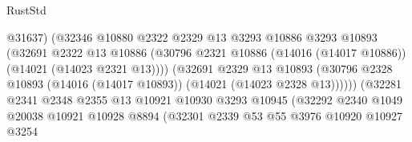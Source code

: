 \begin{lexlean}{RustStd}
\begin{coremodule}
                                          @31637)
                                        (@32346
                                          @10880
                                          @2322
                                          @2329
                                          @13
                                          @3293
                                          @10886
                                          @3293
                                          @10893
                                          (@32691
                                            @2322
                                            @13
                                            @10886
                                            (@30796
                                              @2321
                                              @10886
                                              (@14016 (@14017 @10886))
                                              (@14021 (@14023 @2321 @13))))
                                          (@32691
                                            @2329
                                            @13
                                            @10893
                                            (@30796
                                              @2328
                                              @10893
                                              (@14016 (@14017 @10893))
                                              (@14021 (@14023 @2328 @13))))))
                                      (@32281
                                        @2341
                                        @2348
                                        @2355
                                        @13
                                        @10921
                                        @10930
                                        @3293
                                        @10945
                                        (@32292
                                          @2340
                                          @1049
                                          @20038
                                          @10921
                                          @10928
                                          @8894
                                          (@32301
                                            @2339
                                            @53
                                            @55
                                            @3976
                                            @10920
                                            @10927
                                            @3254

\end{coremodule}
\end{lexlean}

